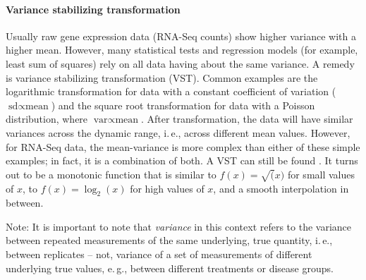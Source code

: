 \paragraph{Variance stabilizing transformation}
Usually raw gene expression data (RNA-Seq counts) show higher variance with a higher mean. However, many statistical tests and regression models (for example, least sum of squares) rely on all data having about the same variance. A remedy is variance stabilizing transformation (VST). Common examples are the logarithmic transformation for data with a constant coefficient of variation ($\text{sd}\propto\text{mean}$) and the square root transformation for data with a Poisson distribution, where $\text{var}\propto\text{mean}$. After transformation, the data will have similar variances across the dynamic range, i.\,e., across different mean values. However, for RNA-Seq data, the mean-variance is more complex than either of these simple examples; in fact, it is a combination of both. A VST can still be found \citep{Anders2010}. It turns out to be a monotonic function that is similar to $f(x)=\sqrt(x)$ for small values of $x$, to $f(x)=\log_2(x)$ for high values of $x$, and a smooth interpolation in between.

Note: It is important to note that \emph{variance} in this context refers to the variance between repeated measurements of the same underlying, true quantity, i.\,e., between replicates -- not, variance of a set of measurements of different underlying true values, e.\,g., between different treatments or disease groups.

